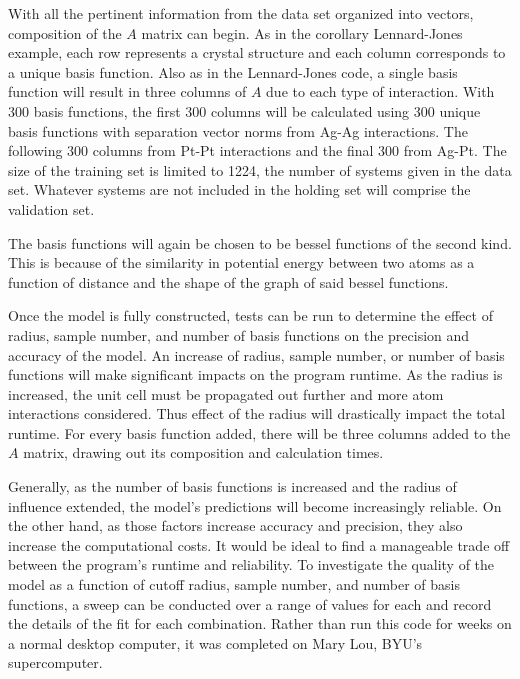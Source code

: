 With all the pertinent information from the data set organized into vectors, composition of the $A$ matrix can begin. As in the corollary Lennard-Jones example, each row represents a crystal structure and each column corresponds to a unique basis function. Also as in the Lennard-Jones code, a single basis function will result in three columns of $A$ due to each type of interaction. With 300 basis functions, the first 300 columns will be calculated using 300 unique basis functions with separation vector norms from Ag-Ag interactions. The following 300 columns from Pt-Pt interactions and the final 300 from Ag-Pt. The size of the training set is limited to 1224, the number of systems given in the data set. Whatever systems are not included in the holding set will comprise the validation set.
\par The basis functions will again be chosen to be bessel functions of the second kind. This is because of the similarity in potential energy between two atoms as a function of distance and the shape of the graph of said bessel functions. 
\par Once the model is fully constructed, tests can be run to determine the effect of radius, sample number, and number of basis functions on the precision and accuracy of the model. An increase of radius, sample number, or number of basis functions will make significant impacts on the program runtime. As the radius is increased, the unit cell must be propagated out further and more atom interactions considered. Thus effect of the radius will drastically impact the total runtime. For every basis function added, there will be three columns added to the $A$ matrix, drawing out its composition and calculation times. 
\par Generally, as the number of basis functions is increased and the radius of influence extended, the model's predictions will become increasingly reliable. On the other hand, as those factors increase accuracy and precision, they also increase the computational costs. It would be ideal to find a manageable trade off between the program's runtime and reliability. To investigate the quality of the model as a function of cutoff radius, sample number, and number of basis functions, a sweep can be conducted over a range of values for each and record the details of the fit for each combination. Rather than run this code for weeks on a normal desktop computer, it was completed on Mary Lou, BYU's supercomputer. 


